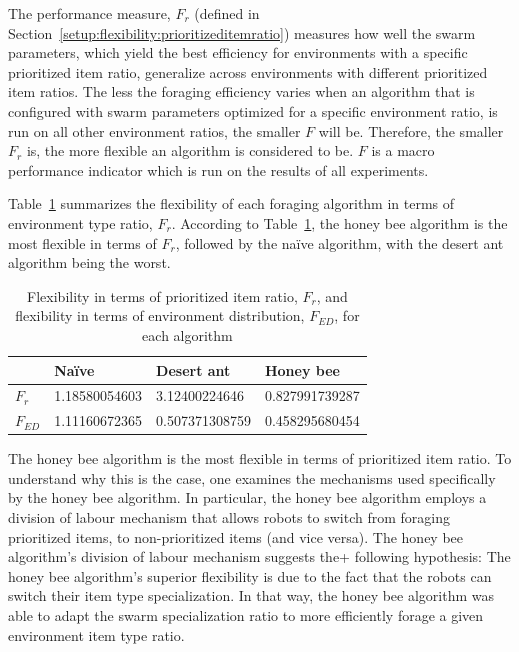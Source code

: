 The performance measure, $F_r$ (defined in Section~\ref{setup:flexibility:prioritizeditemratio}) measures how well the swarm parameters, which yield the best efficiency for environments with a specific prioritized item ratio, generalize across environments with different prioritized item ratios. The less the foraging efficiency varies when an algorithm that is configured with swarm parameters optimized for a specific environment ratio, is run on all other environment ratios, the smaller $F$ will be. Therefore, the smaller $F_r$ is, the more flexible an algorithm is considered to be. $F$ is a macro performance indicator which is run on the results of all experiments. 

Table~\ref{table:flexibility} summarizes the flexibility of each foraging algorithm in terms of environment type ratio, $F_r$. According to Table~\ref{table:flexibility}, the honey bee algorithm is the most flexible in terms of $F_r$, followed by the na\"ive algorithm, with the desert ant algorithm being the worst. 

 
\begin{table}[]
\centering
\caption{Flexibility in terms of prioritized item ratio, $F_r$, and flexibility in terms of environment distribution, $F_{ED}$, for each algorithm}
\label{table:flexibility}
\begin{tabular}{@{}llll@{}}
\toprule
\textbf{}         & Na\"ive         & Desert ant        & Honey bee         \\ \midrule
\textbf{$F_r$}    & 1.18580054603 & 3.12400224646     & 0.827991739287    \\ \midrule
\textbf{$F_{ED}$} & 1.11160672365 & 0.507371308759 & 0.458295680454 
\end{tabular}
\end{table}

The honey bee algorithm is the most flexible in terms of prioritized item ratio. To understand why this is the case, one examines the mechanisms used specifically by the honey bee algorithm. In particular, the honey bee algorithm employs a division of labour mechanism that allows robots to switch from foraging prioritized items, to non-prioritized items (and vice versa). The honey bee algorithm's division of labour mechanism suggests the+ following hypothesis: The honey bee algorithm's superior flexibility is due to the fact that the robots can switch their item type specialization. In that way, the honey bee algorithm was able to adapt the swarm specialization ratio to more efficiently forage a given environment item type ratio.

